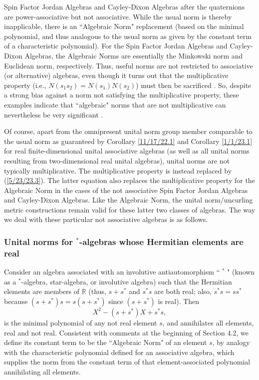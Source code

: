 \documentclass{amsart}
\numberwithin{equation}{section}
\theoremstyle{definition}
\numberwithin{theorem}{section}
\begin{document}
Spin Factor Jordan Algebras and Cayley-Dixon Algebras after the quaternions are power-associative but not associative.  While the usual norm is thereby inapplicable, there is an ``Algebraic Norm" replacement \cite{jacobson:1963} (based on the minimal polynomial, and thus analogous to the usual norm as given by the constant term of a characteristic polynomial).  For the Spin Factor Jordan Algebras and Cayley-Dixon Algebras, the Algebraic Norms are essentially the  Minkowski  norm and Euclidean norm, respectively.  Thus, useful norms are not restricted to associative (or alternative) algebras, even though it turns out that the multiplicative property (i.e., $N(s_1s_2)=N(s_1)N(s_2)$) must then be sacrificed  \cite{schafer:1963}. 
So, despite a strong bias against a norm not satisfying the multiplicative property, these examples indicate that ``algebraic" norms that are not multiplicative can nevertheless be very significant \cite{mccrimmon:2004}. 

Of course, apart from the omnipresent unital norm group member comparable to the usual norm as guaranteed by Corollary \ref{11/17/22.1} and Corollary \ref{1/1/23.1} for real finite-dimensional unital associative algebras (as well as all unital norms resulting from two-dimensional real unital algebras), unital norms are not typically multiplicative.  The multiplicative property is instead replaced by (\ref{5/23/23.3}).  The latter equation also replaces the multiplicative property for the Algebraic Norm in the cases of the not associative Spin Factor Jordan Algebras and Cayley-Dixon Algebras. 
Like the Algebraic Norm, the unital norm/uncurling metric constructions remain valid for these latter two classes of algebras.  The way we deal with these particular not associative algebras is as follows.

\subsubsection{Unital norms for $^*$-algebras whose Hermitian elements are real} 

Consider an algebra associated with an involutive antiautomorphism ``
$^*$ " (known as a $^*$-algebra, star-algebra, or involutive algebra) such that the Hermitian elements are members of $\mathbb{R}$ (thus, $s+s^*$ and $s^*s$ are both real; also, $s^*s = ss^*$ because $(s+s^*)s = s(s+s^*)$ since $(s+s^*)$ is real). 
Then \[ X^2 - (s+s^*)X + s^*s, \] is the minimal polynomial of any not real element $s$, and annihilates all elements, real and not real.  Consistent with comments at the beginning of Section 4.2, we define its constant term to be the ``Algebraic Norm" of an element $s$, by analogy with the characteristic polynomial defined for an associative algebra, which supplies the norm from the constant term of that element-associated polynomial annihilating all elements.
\end{document}
